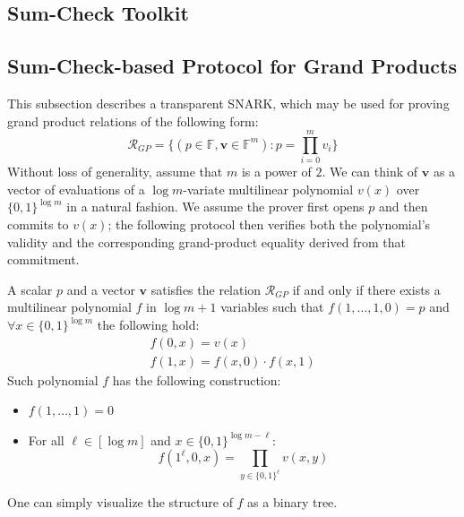 \documentclass[../lecture-notes-148x210.tex]{subfiles}
\begin{document}
\subsection*{Sum-Check Toolkit}

\subsection{Sum-Check-based Protocol for Grand Products}
\label{sec:grand-products}

This subsection describes a transparent SNARK, which may be used for proving grand product relations of the following form:
\begin{equation}
\mathcal{R}_{GP} = \big\{ (p \in \mathbb{F}, \mathbf{v} \in \mathbb{F}^m)\colon p = \prod_{i=0}^m v_i \big\} \label{grand-product-relation}
\end{equation}
Without loss of generality, assume that $m$ is a power of $2$.
We can think of $\mathbf{v}$ as a vector of evaluations of a $\log m$-variate multilinear polynomial $v(x)$ over 
$\{0, 1\}^{\log m}$ in a natural fashion. We assume the prover first opens $p$ and then commits to $v(x)$; the 
following protocol then verifies both the polynomial’s validity and the corresponding grand-product equality derived
from that commitment.

\begin{lemma}
A scalar $p$ and a vector $\mathbf{v}$ satisfies the relation $\mathcal{R}_{GP}$ if and only if there exists a 
multilinear polynomial $f$ in $\log m + 1$ variables such that $f(1,\dots,1, 0) = p$ and $\forall x \in \{0,1\}^{\log m}$
 the following hold:
\begin{gather*}
f(0, x) = v(x)\\
f(1,x) = f(x, 0) \cdot f(x, 1)
\end{gather*}
Such polynomial $f$ has the following construction: \begin{itemize}
    \item $f(1,\dots,1) = 0$
    \item For all $\ell \in [\log m]$ and $x \in \{0,1\}^{\log m - \ell}$: \\ 
    \vspace{-0.8em}
    \begin{equation*}
        f(1^\ell, 0, x) = \prod_{y \in \{0,1\}^\ell}v(x,y)
    \end{equation*}
\end{itemize}
\end{lemma}

One can simply visualize the structure of $f$ as a binary tree.
\end{document}
